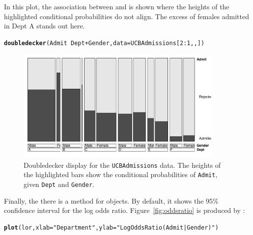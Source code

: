 \documentclass[10pt,twoside]{article}\usepackage[]{graphicx}\usepackage[]{color}
\makeatletter
\newcommand{\hlnum}[1]{\textcolor[rgb]{0.686,0.059,0.569}{#1}}%
\newcommand{\hlstr}[1]{\textcolor[rgb]{0.192,0.494,0.8}{#1}}%
\newcommand{\hlopt}[1]{\textcolor[rgb]{0,0,0}{#1}}%
\newcommand{\hlstd}[1]{\textcolor[rgb]{0.345,0.345,0.345}{#1}}%
\newcommand{\hlkwc}[1]{\textcolor[rgb]{0.333,0.667,0.333}{#1}}%
\newcommand{\hlkwd}[1]{\textcolor[rgb]{0.737,0.353,0.396}{\textbf{#1}}}%
\newenvironment{kframe}{%
 \def\at@end@of@kframe{}%
 \ifinner\ifhmode%
  \def\at@end@of@kframe{\end{minipage}}%
  \begin{minipage}{\columnwidth}%
 \fi\fi%
 \def\FrameCommand##1{\hskip\@totalleftmargin \hskip-\fboxsep
 \colorbox{shadecolor}{##1}\hskip-\fboxsep
     \hskip-\linewidth \hskip-\@totalleftmargin \hskip\columnwidth}%
 \MakeFramed {\advance\hsize-\width
   \@totalleftmargin\z@ \linewidth\hsize
   \@setminipage}}%
 {\par\unskip\endMakeFramed%
 \at@end@of@kframe}
\newenvironment{knitrout}{}{} %
\newcommand{\figref}[1]{Figure~\ref{#1}}
\newcommand{\data}[1]{\texttt{#1}}
\newcommand{\codefun}[1]{\code{#1()}}
\makeatother
\begin{document}
In this plot, the
association between  and  is shown
where the heights of the highlighted conditional probabilities
do not align. The excess of females admitted in Dept A stands out here.

\begin{knitrout}
\color{fgcolor}\begin{kframe}
\begin{alltt}
\hlkwd{doubledecker}\hlstd{(Admit} \hlopt{~} \hlstd{Dept} \hlopt{+} \hlstd{Gender,} \hlkwc{data}\hlstd{=UCBAdmissions[}\hlnum{2}\hlopt{:}\hlnum{1}\hlstd{,,])}
\end{alltt}
\end{kframe}
\end{knitrout}


\begin{figure}[htb]
\begin{center}
\includegraphics[width=0.9\textwidth]{fig/vcd-tut-doubledecker}
\caption{Doubledecker display for the \data{UCBAdmissions} data. The heights
of the highlighted bars show the conditional probabilities of \texttt{Admit},
given \texttt{Dept} and \texttt{Gender}.}
\label{fig:doubledecker}
\end{center}
\end{figure}

Finally, the there is a \codefun{plot} method for  objects.
By default, it shows the 95\% confidence interval for the log odds ratio.
\figref{fig:oddsratio} is produced by : 
\begin{knitrout}
\color{fgcolor}\begin{kframe}
\begin{alltt}
\hlkwd{plot}\hlstd{(lor,} \hlkwc{xlab}\hlstd{=}\hlstr{"Department"}\hlstd{,} \hlkwc{ylab}\hlstd{=}\hlstr{"Log Odds Ratio (Admit | Gender)"}\hlstd{)}
\end{alltt}
\end{kframe}
\end{knitrout}
\end{document}
